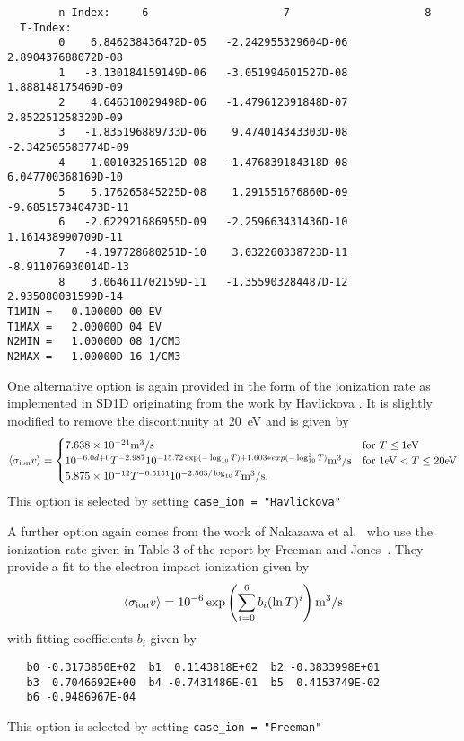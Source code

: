 \documentclass[amsmath,amssymb,a4]{revtex4-2}
\begin{document}
\begin{small}
\begin{verbatim}
        n-Index:     6                     7                     8
  T-Index:
        0    6.846238436472D-05   -2.242955329604D-06    2.890437688072D-08
        1   -3.130184159149D-06   -3.051994601527D-08    1.888148175469D-09
        2    4.646310029498D-06   -1.479612391848D-07    2.852251258320D-09
        3   -1.835196889733D-06    9.474014343303D-08   -2.342505583774D-09
        4   -1.001032516512D-08   -1.476839184318D-08    6.047700368169D-10
        5    5.176265845225D-08    1.291551676860D-09   -9.685157340473D-11
        6   -2.622921686955D-09   -2.259663431436D-10    1.161438990709D-11
        7   -4.197728680251D-10    3.032260338723D-11   -8.911076930014D-13
        8    3.064611702159D-11   -1.355903284487D-12    2.935080031599D-14
T1MIN =   0.10000D 00 EV
T1MAX =   2.00000D 04 EV
N2MIN =   1.00000D 08 1/CM3
N2MAX =   1.00000D 16 1/CM3
\end{verbatim}\end{small}

One alternative option is again provided in the form of the ionization rate as implemented in SD1D originating from the work by Havlickova \cite{havlickova2013}. It is slightly modified to remove the discontinuity at 20~eV and is given by \cite{SD1D}
\begin{equation}\label{ionization_SD1D}
    \langle\sigma_{\rm ion} v\rangle = \begin{cases} 7.638 \times 10^{-21} {\rm m}^3/{\rm s}             & \mbox{for } T \le 1 {\rm eV} \\
                                        10^{-6.0d+0} T^{-2.987} 10^{-15.72 \exp(-\log_{10}T) + 1.603*exp(-\log_{10}^2T)} {\rm m}^3/{\rm s} & \mbox{for } 1 {\rm eV} < T \le 20 {\rm eV} \\
                                        5.875 \times 10^{-12} T^{-0.5151} 10^{-2.563/\log_{10}T} {\rm m}^3/{\rm s}. \end{cases}
\end{equation}
This option is selected by setting {\tt case\_ion = "Havlickova"}

A further option again comes from the work of Nakazawa et al.~\cite{nakazawa2000} who use the ionization rate given in Table 3 of the report by Freeman and Jones~\cite{freeman1974}. They provide a fit to the electron impact ionization given by
\begin{equation}\label{ionization_FJ}
    \langle\sigma_{\rm ion} v\rangle = 10^{-6} \exp\left( \sum_{i=0}^6 b_i (\ln T)^i \right)  {\rm m}^3/{\rm s}
\end{equation}
with fitting coefficients $b_i$ given by
\begin{small}\begin{verbatim}
   b0 -0.3173850E+02  b1  0.1143818E+02  b2 -0.3833998E+01
   b3  0.7046692E+00  b4 -0.7431486E-01  b5  0.4153749E-02
   b6 -0.9486967E-04
\end{verbatim}\end{small}
This option is selected by setting {\tt case\_ion = "Freeman"}
\end{document}
